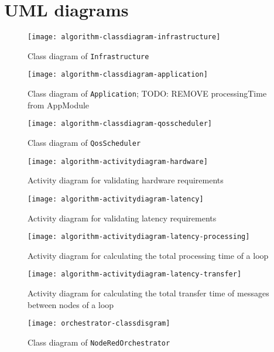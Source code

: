\chapter{UML diagrams\label{cha:algorithm-UML-diagrams}}

\begin{figure}[htb]
    \centering
    \texttt{[image: algorithm-classdiagram-infrastructure]}
    \caption{Class diagram of \texttt{Infrastructure}}
    \label{fig:classdiagram-infrastructure}
\end{figure}

\begin{figure}[htb]
    \centering
    \texttt{[image: algorithm-classdiagram-application]}
    \caption{Class diagram of \texttt{Application}; TODO: REMOVE processingTime from AppModule}
    \label{fig:classdiagram-application}
\end{figure}

\begin{figure}[htb]
    \centering
    \texttt{[image: algorithm-classdiagram-qosscheduler]}
    \caption{Class diagram of \texttt{QosScheduler}}
    \label{fig:classdiagram-qosscheduler}
\end{figure}

\begin{figure}[htb]
    \centering
    \texttt{[image: algorithm-activitydiagram-hardware]}
    \caption{Activity diagram for validating hardware requirements}
    \label{fig:algorithm-activitydiagram-hardware}
\end{figure}


\begin{figure}[htb]
    \centering
    \texttt{[image: algorithm-activitydiagram-latency]}
    \caption{Activity diagram for validating latency requirements}
    \label{fig:algorithm-activitydiagram-latency}
\end{figure}

\begin{figure}[htb]
    \centering
    \texttt{[image: algorithm-activitydiagram-latency-processing]}
    \caption{Activity diagram for calculating the total processing time of a loop}
    \label{fig:algorithm-activitydiagram-latency-processing}
\end{figure}

\begin{figure}[htb]
    \centering
    \texttt{[image: algorithm-activitydiagram-latency-transfer]}
    \caption{Activity diagram for calculating the total transfer time of messages between nodes of a loop}
    \label{fig:algorithm-activitydiagram-latency-transfer}
\end{figure}

\begin{figure}[htb]
    \centering
    \texttt{[image: orchestrator-classdisgram]}
    \caption{Class diagram of \texttt{NodeRedOrchestrator}}
    \label{fig:orchestrator-classdisgram}
\end{figure}